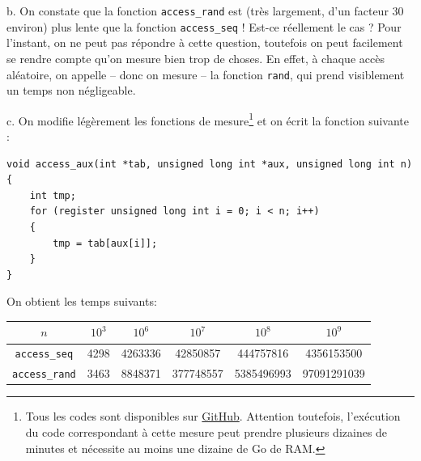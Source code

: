 \documentclass[11pt, a4 paper]{article}
\begin{document}
b. On constate que la fonction \texttt{access\_rand} est (très largement, d'un facteur 30 environ) plus lente que la fonction \texttt{access\_seq} ! Est-ce réellement le cas ? Pour l'instant, on ne peut pas répondre à cette question, toutefois on peut facilement se rendre compte qu'on mesure bien trop de choses. En effet, à chaque accès aléatoire, on appelle -- donc on mesure -- la fonction \texttt{rand}, qui prend visiblement un temps non négligeable.


c. On modifie légèrement les fonctions de mesure\footnote{Tous les codes sont disponibles sur \href{https://github.com/VTrelat/ComputerArchitecture/tree/main/c}{GitHub}. Attention toutefois, l'exécution du code correspondant à cette mesure peut prendre plusieurs dizaines de minutes et nécessite au moins une dizaine de Go de RAM.} et on écrit la fonction suivante :
\begin{lstlisting}[style=CStyle]
void access_aux(int *tab, unsigned long int *aux, unsigned long int n)
{
    int tmp;
    for (register unsigned long int i = 0; i < n; i++)
    {
        tmp = tab[aux[i]];
    }
}
\end{lstlisting}
On obtient les temps suivants:
\begin{center}
    \begin{tabular}{| c | c | c | c | c | c |}
        \hline
    $n$ & $10^3$ & $10^6$ & $10^7$ & $10^8$ & $10^9$ \\
        \hline
        \hline
        \texttt{access\_seq} & 4298 & 4263336 & 42850857 & 444757816 & 4356153500 \\
        \hline
        \texttt{access\_rand} & 3463 & 8848371 & 377748557 & 5385496993 & 97091291039 \\
        \hline
    \end{tabular}
\end{center}
\end{document}
